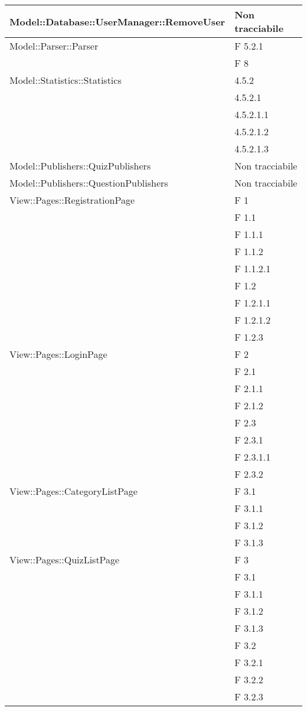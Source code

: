 \begin{longtable}{p{}p{}}
\midrule
Model::Database::UserManager::RemoveUser	& Non tracciabile\\

\midrule
Model::Parser::Parser		& F 5.2.1\\
							& F 8\\

\midrule
Model::Statistics::Statistics	& 4.5.2\\
								& 4.5.2.1\\
								& 4.5.2.1.1\\
								& 4.5.2.1.2\\
								& 4.5.2.1.3\\

\midrule

Model::Publishers::QuizPublishers	& Non tracciabile\\

\midrule
Model::Publishers::QuestionPublishers	& Non tracciabile\\


\midrule
View::Pages::RegistrationPage	& F 1\\
								& F 1.1\\
								& F 1.1.1\\
								& F 1.1.2\\
								& F 1.1.2.1\\
								& F 1.2\\
								& F 1.2.1.1\\
								& F 1.2.1.2\\
								& F 1.2.3\\
\midrule
View::Pages::LoginPage			& F 2\\
								& F 2.1\\
								& F 2.1.1\\
								& F 2.1.2\\
								& F 2.3\\
								& F 2.3.1\\
								& F 2.3.1.1\\
								& F 2.3.2\\
								
\midrule
View::Pages::CategoryListPage					& F 3.1\\
								& F 3.1.1\\
								& F 3.1.2\\
								& F 3.1.3\\

\midrule
View::Pages::QuizListPage					& F 3\\
								& F 3.1\\
								& F 3.1.1\\
								& F 3.1.2\\
								& F 3.1.3\\
								& F 3.2\\
								& F 3.2.1\\
								& F 3.2.2\\
								& F 3.2.3\\
								

\end{longtable}
